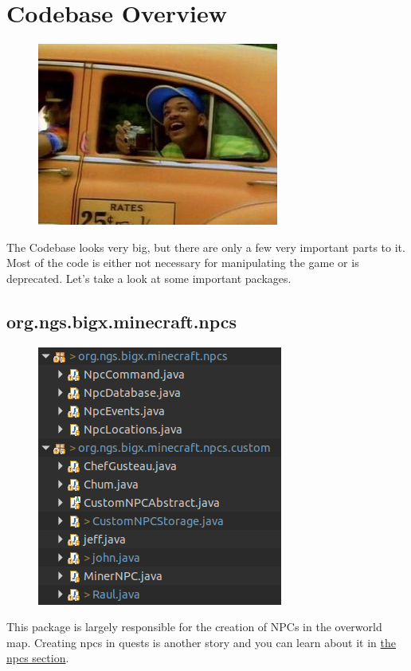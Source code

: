 \documentclass[12pt]{article}
\begin{document}
\section {Codebase Overview}
\label{sec:overview}
\begin{figure}[H]
	\includegraphics[scale=0.5]{images/will_smith_with_camera}
	\centering
\end{figure}
The Codebase looks very big, but there are only a few very important parts to it. Most of the code is either not necessary for manipulating the game or is deprecated. Let's take a look at some important packages. 

\subsection{org.ngs.bigx.minecraft.npcs}
\begin{figure}[H]
	\includegraphics[scale=0.5]{images/tour/orgNgsBigxMinecraftNpcs.png}
	\centering
\end{figure}

This package is largely responsible for the creation of NPCs in the overworld map. Creating npcs in quests is another story and you can learn about it in \hyperref[sec:npcs]{the npcs section}. 
\end{document}
